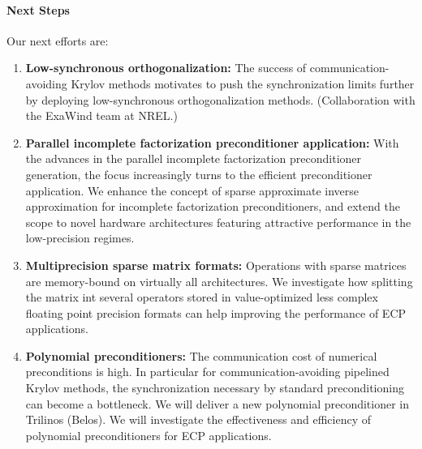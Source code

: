 \paragraph{Next Steps}


Our next efforts are:
\begin{enumerate}
	\item \textbf{Low-synchronous orthogonalization:} The success of 
	communication-avoiding Krylov methods motivates to push the synchronization 
	limits further by deploying low-synchronous orthogonalization methods.
        (Collaboration with the ExaWind team at NREL.)
	\item \textbf{Parallel incomplete factorization preconditioner 
	application:} With the advances in the parallel incomplete factorization
	preconditioner generation, the focus increasingly turns to the efficient 
	preconditioner application. We enhance the concept of sparse approximate 
	inverse approximation for incomplete factorization preconditioners, and 
	extend the scope to novel hardware architectures featuring attractive 
	performance in the low-precision regimes.
	\item \textbf{Multiprecision sparse matrix formats:} Operations with sparse 
	matrices are memory-bound on virtually all architectures. We investigate 
	how splitting the matrix int several operators stored in value-optimized 
	less complex floating point precision formats can help improving the 
	performance of ECP applications.
	\item \textbf{Polynomial preconditioners:} The communication cost of 
	numerical preconditions is high. In particular for communication-avoiding 
	pipelined Krylov methods, the synchronization necessary by standard 
	preconditioning can become a bottleneck. We will deliver a new
        polynomial preconditioner in Trilinos (Belos). We will investigate the effectiveness 
	and efficiency of polynomial preconditioners for ECP applications.
\end{enumerate}
